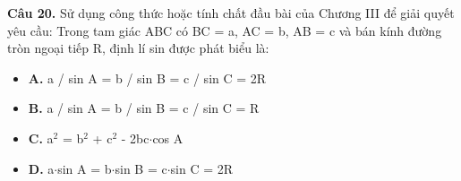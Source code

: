 \documentclass[11pt,a4paper]{article}
\begin{document}
\textbf{\color{primary} Câu 20.} Sử dụng công thức hoặc tính chất đầu bài của Chương III để giải quyết yêu cầu: Trong tam giác ABC có BC = a, AC = b, AB = c và bán kính đường tròn ngoại tiếp R, định lí sin được phát biểu là:\par
\begin{itemize}\setlength{\itemsep}{1pt}\setlength{\parskip}{0pt}
  \item[] \textbf{A.} a / sin A = b / sin B = c / sin C = 2R
  \item[] \textbf{B.} a / sin A = b / sin B = c / sin C = R
  \item[] \textbf{C.} a$^2$ = b$^2$ + c$^2$ - 2bc$\cdot$cos A
  \item[] \textbf{D.} a$\cdot$sin A = b$\cdot$sin B = c$\cdot$sin C = 2R
\end{itemize}\vspace{2pt}
\end{document}
